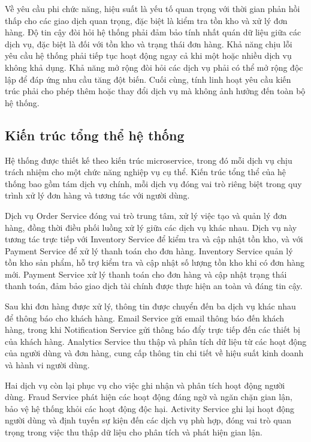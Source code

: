 Về yêu cầu phi chức năng, hiệu suất là yếu tố quan trọng với thời gian phản hồi thấp cho các giao dịch quan trọng, đặc biệt là kiểm tra tồn kho và xử lý đơn hàng. Độ tin cậy đòi hỏi hệ thống phải đảm bảo tính nhất quán dữ liệu giữa các dịch vụ, đặc biệt là đối với tồn kho và trạng thái đơn hàng. Khả năng chịu lỗi yêu cầu hệ thống phải tiếp tục hoạt động ngay cả khi một hoặc nhiều dịch vụ không khả dụng. Khả năng mở rộng đòi hỏi các dịch vụ phải có thể mở rộng độc lập để đáp ứng nhu cầu tăng đột biến. Cuối cùng, tính linh hoạt yêu cầu kiến trúc phải cho phép thêm hoặc thay đổi dịch vụ mà không ảnh hưởng đến toàn bộ hệ thống.

\subsection{Kiến trúc tổng thể hệ thống}
Hệ thống được thiết kế theo kiến trúc microservice, trong đó mỗi dịch vụ chịu trách nhiệm cho một chức năng nghiệp vụ cụ thể. Kiến trúc tổng thể của hệ thống bao gồm tám dịch vụ chính, mỗi dịch vụ đóng vai trò riêng biệt trong quy trình xử lý đơn hàng và tương tác với người dùng.

Dịch vụ Order Service đóng vai trò trung tâm, xử lý việc tạo và quản lý đơn hàng, đồng thời điều phối luồng xử lý giữa các dịch vụ khác nhau. Dịch vụ này tương tác trực tiếp với Inventory Service để kiểm tra và cập nhật tồn kho, và với Payment Service để xử lý thanh toán cho đơn hàng. Inventory Service quản lý tồn kho sản phẩm, hỗ trợ kiểm tra và cập nhật số lượng tồn kho khi có đơn hàng mới. Payment Service xử lý thanh toán cho đơn hàng và cập nhật trạng thái thanh toán, đảm bảo giao dịch tài chính được thực hiện an toàn và đáng tin cậy.

Sau khi đơn hàng được xử lý, thông tin được chuyển đến ba dịch vụ khác nhau để thông báo cho khách hàng. Email Service gửi email thông báo đến khách hàng, trong khi Notification Service gửi thông báo đẩy trực tiếp đến các thiết bị của khách hàng. Analytics Service thu thập và phân tích dữ liệu từ các hoạt động của người dùng và đơn hàng, cung cấp thông tin chi tiết về hiệu suất kinh doanh và hành vi người dùng.

Hai dịch vụ còn lại phục vụ cho việc ghi nhận và phân tích hoạt động người dùng. Fraud Service phát hiện các hoạt động đáng ngờ và ngăn chặn gian lận, bảo vệ hệ thống khỏi các hoạt động độc hại. Activity Service ghi lại hoạt động người dùng và định tuyến sự kiện đến các dịch vụ phù hợp, đóng vai trò quan trọng trong việc thu thập dữ liệu cho phân tích và phát hiện gian lận.

